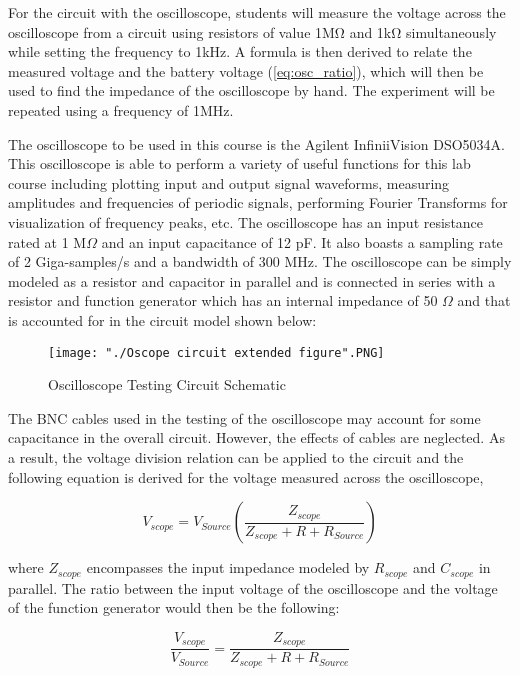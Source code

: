 For the circuit with the oscilloscope, students will measure the voltage across the oscilloscope from a circuit using resistors of value 1MΩ and 1kΩ simultaneously while setting the frequency to 1kHz. A formula is then derived to relate the measured voltage and the battery voltage (\ref{eq:osc_ratio}), which will then be used to find the impedance of the oscilloscope by hand. The experiment will be repeated using a frequency of 1MHz.

The oscilloscope to be used in this course is the Agilent InfiniiVision DSO5034A. This oscilloscope is able to perform a variety of useful functions for this lab course including plotting input and output signal waveforms, measuring amplitudes and frequencies of periodic signals, performing Fourier Transforms for visualization of frequency peaks, etc. The oscilloscope has an input resistance rated at 1 M$\Omega$ and an input capacitance of 12 pF. It also boasts a sampling rate of 2 Giga-samples/s and a bandwidth of 300 MHz. The oscilloscope can be simply modeled as a resistor and capacitor in parallel and is connected in series with a resistor and function generator which has an internal impedance of 50 $\Omega$ and that is accounted for in the circuit model shown below: 

\begin{figure}[h!]
	\centering
	\texttt{[image: "./Oscope circuit extended figure".PNG]}
	\caption{Oscilloscope Testing Circuit Schematic}
	\label{fig:scope_circuit}
\end{figure}


The BNC cables used in the testing of the oscilloscope may account for some capacitance in the overall circuit. However, the effects of cables are neglected. As a result, the voltage division relation can be applied to the circuit and the following equation is derived for the voltage measured across the oscilloscope,

\begin{equation}
	\label{eq:vscope}
	V_{scope} = V_{Source}(\frac{Z_{scope}}{Z_{scope} + R + R_{Source}}) 
\end{equation}
	
where $Z_{scope}$ encompasses the input impedance modeled by $R_{scope}$ and $C_{scope}$ in parallel. The ratio between the input voltage of the oscilloscope and the voltage of the function generator would then be the following:

\begin{equation}
	\label{eq:osc_ratio}
	\frac{V_{scope}}{V_{Source}} = \frac{Z_{scope}}{Z_{scope} + R + R_{Source}} 
\end{equation}
